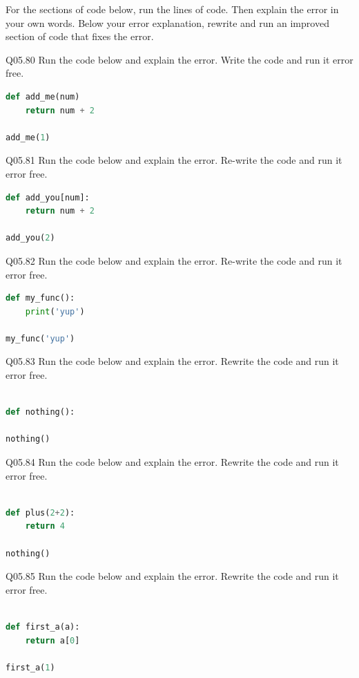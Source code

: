 \documentclass{book}
\begin{document}
For the sections of code below, run the lines of code. Then explain the
error in your own words. Below your error explanation, rewrite and run
an improved section of code that fixes the error.

Q05.80 Run the code below and explain the error. Write the code and run
it error free.

\begin{lstlisting}[language=Python]
def add_me(num)
    return num + 2

add_me(1)
\end{lstlisting}

Q05.81 Run the code below and explain the error. Re-write the code and
run it error free.

\begin{lstlisting}[language=Python]
def add_you[num]:
    return num + 2
    
add_you(2)
\end{lstlisting}

Q05.82 Run the code below and explain the error. Re-write the code and
run it error free.

\begin{lstlisting}[language=Python]
def my_func():
    print('yup')
    
my_func('yup')
\end{lstlisting}

Q05.83 Run the code below and explain the error. Rewrite the code and
run it error free.

\begin{lstlisting}[language=Python]

def nothing():
    
nothing()
\end{lstlisting}

Q05.84 Run the code below and explain the error. Rewrite the code and
run it error free.

\begin{lstlisting}[language=Python]

def plus(2+2):
    return 4 
    
nothing()
\end{lstlisting}

Q05.85 Run the code below and explain the error. Rewrite the code and
run it error free.

\begin{lstlisting}[language=Python]

def first_a(a):
    return a[0]
    
first_a(1)
\end{lstlisting}
    
\end{document}
